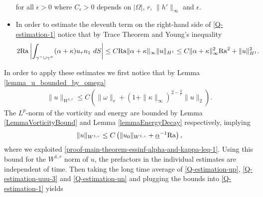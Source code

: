 \documentclass{article}
\theoremstyle{definition}
\theoremstyle{definition}
\newcommand{\Ra}{{\rm{Ra}}}
\begin{document}
\begin{itemize}
\begin{equation}
\begin{aligned}
        \end{aligned}
    \end{equation}
    for all $\epsilon>0$ where $C_\epsilon>0$ depends on $|\Omega|$, $r$, $\|h'\|_{\infty}$ and $\epsilon$.
    \item
    In order to estimate the eleventh term on the right-hand side of \eqref{Q-estimation-1} notice that by Trace Theorem and Young's inequality
    \begin{align}
        \label{Q-estimation-un}
        2\Ra \left|\int_{\gamma^-\cup\gamma^+} (\alpha+\kappa) u_\tau n_1 \ dS\right| &\leq C \Ra \|\alpha+\kappa\|_\infty \|u\|_{H^1} \leq C \|\alpha+\kappa\|_\infty^2\Ra^2 +  \|u\|_{H^1}^2.
    \end{align}
\end{itemize}
In order to apply these estimates we first notice that by Lemma \ref{lemma_u_bounded_by_omega}
\begin{align*}
    \|u\|_{W^{1,r}}\leq C \left(\|\omega\|_r + (1+\|\kappa\|_\infty)^{2-\frac{2}{r}}\|u\|_2\right).
\end{align*}
The $L^p$-norm of the vorticity and energy are bounded by Lemma \ref{LemmaVorticityBound} and Lemma \ref{lemmaEnergyDecay} respectively, implying
\begin{align*}
    \|u\|_{W^{1,r}}\leq C \left(\|u_0\|_{W^{1,r}} +\underline{\alpha}^{-1}\Ra\right),
\end{align*}
where we exploited \eqref{proof-main-theorem-essinf-alpha-and-kappa-leq-1}.
Using this bound for the $W^{1,r}$ norm of $u$, the prefactors in the individual estimates are independent of time. Then taking the long time average of \eqref{Q-estimation-up}, \eqref{Q-estimation-uuu-3} and \eqref{Q-estimation-un} and plugging the bounds into \eqref{Q-estimation-1} yields
\end{document}
